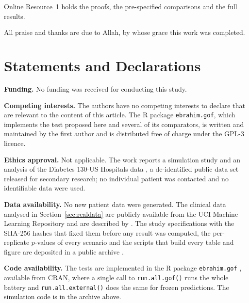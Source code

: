 \documentclass[pdflatex,sn-mathphys-ay]{sn-jnl}
\theoremstyle{thmstyleone}
\begin{document}










\begin{appendices}

\end{appendices}

\backmatter

Online Resource~1 holds the proofs, the pre-specified comparisons and the full results.

All praise and thanks are due to Allah, by whose grace this work was completed.

\section*{Statements and Declarations}

\noindent\textbf{Funding.} No funding was received for conducting this study.

\smallskip\noindent\textbf{Competing interests.} The authors have no competing interests to declare
that are relevant to the content of this article. The R package \texttt{ebrahim.gof}, which
implements the test proposed here and several of its comparators, is written and maintained by the
first author and is distributed free of charge under the GPL-3 licence.

\smallskip\noindent\textbf{Ethics approval.} Not applicable. The work reports a simulation study and
an analysis of the Diabetes 130-US Hospitals data \citep{clore2014uci}, a de-identified public data
set released for secondary research; no individual patient was contacted and no identifiable data
were used.

\smallskip\noindent\textbf{Data availability.} No new patient data were generated. The clinical data
analysed in Section~\ref{sec:realdata} are publicly available from the UCI Machine Learning Repository
\citep{clore2014uci} and are described by \citet{strack2014impact}. The study specifications with the
SHA-256 hashes that fixed them before any result was computed, the per-replicate $p$-values of every
scenario and the scripts that build every table and figure are deposited in a public archive
\citep{edge2_repro_2026}.

\smallskip\noindent\textbf{Code availability.} The tests are implemented in the R package
\texttt{ebrahim.gof} \citep{ebrahim2025gof}, available from CRAN, where a single call to
\texttt{run.all.gof()} runs the whole battery and \texttt{run.all.external()} does the same for frozen
predictions. The simulation code is in the archive above.
\end{document}
